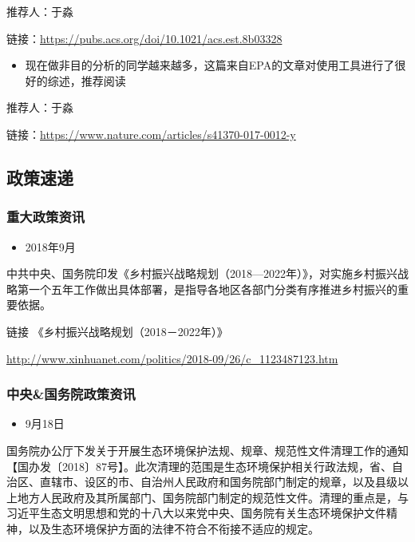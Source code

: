 \documentclass[]{book}
\providecommand{\tightlist}{%
  \setlength{\itemsep}{0pt}\setlength{\parskip}{0pt}}
\begin{document}
推荐人：于淼

链接：\url{https://pubs.acs.org/doi/10.1021/acs.est.8b03328}

\begin{itemize}
\tightlist
\item
  现在做非目的分析的同学越来越多，这篇来自EPA的文章对使用工具进行了很好的综述，推荐阅读
\end{itemize}

推荐人：于淼

链接：\url{https://www.nature.com/articles/s41370-017-0012-y}

\subsection*{政策速递}\label{-5}

\subsubsection*{重大政策资讯}\label{-5}

\begin{itemize}
\tightlist
\item
  2018年9月
\end{itemize}

中共中央、国务院印发《乡村振兴战略规划（2018---2022年）》，对实施乡村振兴战略第一个五年工作做出具体部署，是指导各地区各部门分类有序推进乡村振兴的重要依据。

链接 《乡村振兴战略规划（2018－2022年）》

\url{http://www.xinhuanet.com/politics/2018-09/26/c_1123487123.htm}

\subsubsection*{中央\&国务院政策资讯}\label{-5}

\begin{itemize}
\tightlist
\item
  9月18日
\end{itemize}

国务院办公厅下发关于开展生态环境保护法规、规章、规范性文件清理工作的通知【国办发〔2018〕87号】。此次清理的范围是生态环境保护相关行政法规，省、自治区、直辖市、设区的市、自治州人民政府和国务院部门制定的规章，以及县级以上地方人民政府及其所属部门、国务院部门制定的规范性文件。清理的重点是，与习近平生态文明思想和党的十八大以来党中央、国务院有关生态环境保护文件精神，以及生态环境保护方面的法律不符合不衔接不适应的规定。
\end{document}
